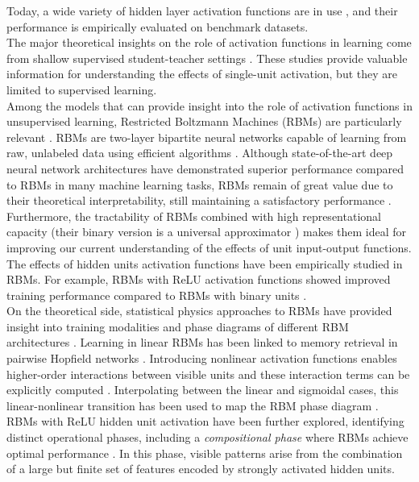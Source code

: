 \documentclass[11pt,letterpaper]{article}
\renewcommand{\red}[1]{#1}
\begin{document}
Today, a wide variety of hidden layer activation functions are in use \cite{kunc2024three}, and their performance is empirically evaluated on benchmark datasets.\\
The major theoretical insights on the role of activation functions in learning come from shallow supervised student-teacher settings \cite{oostwal2021hidden,citton2025phase,nishiyama2025solution,MANZAN2025}. {\red{ These studies provide valuable information for understanding the effects of single-unit activation, but they are limited to supervised learning.}}\\
Among the models that can provide insight into the role of activation functions in unsupervised learning, Restricted Boltzmann Machines (RBMs) are particularly relevant \cite{diSarra_2025, 6302931}. RBMs are two-layer bipartite neural networks capable of learning from raw, unlabeled data using efficient algorithms \cite{10.1007/978-3-642-33275-3_2,ACKLEY1985147}. Although state-of-the-art deep neural network architectures have demonstrated superior performance compared to RBMs in many machine learning tasks, RBMs remain of great value due to their theoretical interpretability, still maintaining a satisfactory performance \cite{diSarra_2025}. Furthermore, the tractability of RBMs combined with high representational capacity (their binary version is a universal approximator \cite{le2008representational}) makes them ideal for improving our current understanding of the effects of unit input-output functions.\\
The effects of hidden units activation functions have been empirically studied in RBMs. For example, RBMs with ReLU activation functions showed improved training performance compared to RBMs with binary units \cite{10.5555/3104322.3104425}.\\
On the theoretical side, statistical physics approaches to RBMs have provided insight into training modalities and phase diagrams of different RBM architectures \cite{decelle2021restricted, e23010034, Bonnaire2025}. Learning in linear RBMs has been linked to memory retrieval in pairwise Hopfield networks \cite{Barra:2012aa,fachechi2025fundamental}. Introducing nonlinear activation functions enables higher-order interactions between visible units and these interaction terms can be explicitly computed \cite{10.1162/neco_a_01420, decelle2024inferring}. Interpolating between the linear and sigmoidal cases, this linear-nonlinear transition has been used to map the RBM phase diagram \cite{PhysRevE.96.042156, PhysRevE.97.022310}. RBMs with ReLU hidden unit activation have been further explored, identifying distinct operational phases, including a \textit{compositional phase} where RBMs achieve optimal performance \cite{PhysRevLett.118.138301}. In this phase, visible patterns arise from the combination of a large but finite set of features encoded by strongly activated hidden units.\\
\end{document}
